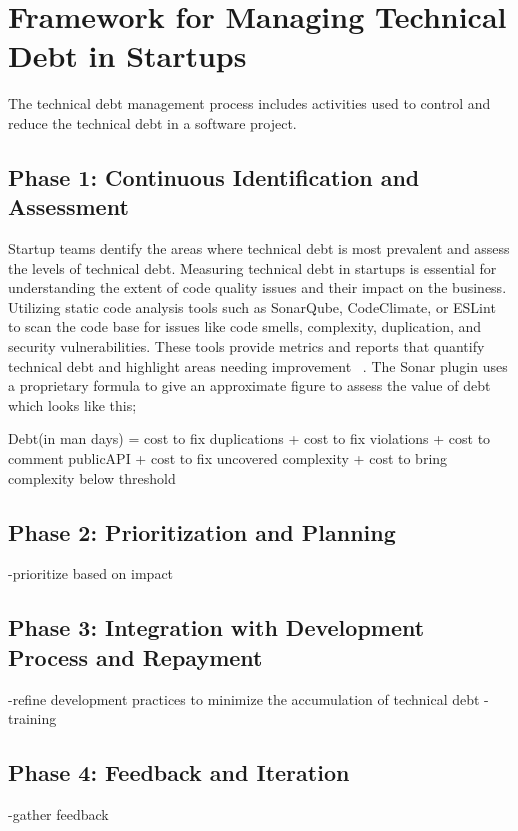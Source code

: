 \section{Framework for Managing Technical Debt in Startups}
\label{Sec:Framework}


The technical debt management process includes activities used to control and reduce the technical debt in a software project.

\subsection{ Phase 1: Continuous Identification and Assessment}
Startup teams dentify the areas where technical debt is most prevalent and assess the levels of technical debt.
Measuring technical debt in startups is essential for understanding the extent of code quality issues and their impact on the business.
Utilizing static code analysis tools such as SonarQube, CodeClimate, or ESLint to scan the code base for issues like code smells, complexity, duplication, and security vulnerabilities.
These tools provide metrics and reports that quantify technical debt and highlight areas needing improvement ~\cite{Whopayso60:online}.
The Sonar plugin uses a proprietary formula to give an approximate figure to assess the value of debt which looks like this;

Debt(in man days) = cost to fix duplications + cost to fix violations + cost to comment publicAPI + cost to fix uncovered complexity + cost to bring complexity below threshold

\subsection{Phase 2: Prioritization and Planning}
-prioritize based on impact

\subsection{Phase 3: Integration with Development Process and Repayment}
-refine development practices to minimize the accumulation of technical debt
-training

\subsection{Phase 4: Feedback and Iteration}
-gather feedback

